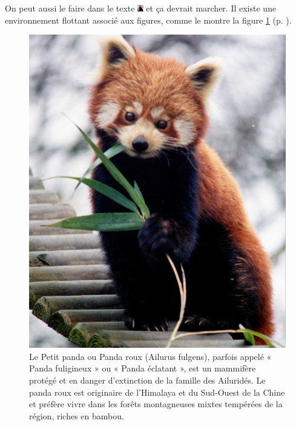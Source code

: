 \documentclass[10pt,a4paper]{article}
\begin{document}
On peut aussi le faire dans le texte \includegraphics[width=2.5mm]{figures/firefox.jpg} et ça devrait marcher. 
Il existe une environnement flottant associé aux figures, comme le montre la figure \ref{fig:panda_roux} (p. \pageref{fig:panda_roux}).

\begin{figure}[b!]
\begin{center}
\includegraphics[width=1.\textwidth]{figures/firefox.jpg} %
\end{center}
\caption{Le Petit panda ou Panda roux (Ailurus fulgens), parfois appelé « Panda fuligineux » ou « Panda éclatant », est un mammifère protégé et en danger d'extinction de la famille des Ailuridés. 
Le panda roux est originaire de l'Himalaya et du Sud-Ouest de la Chine et préfère vivre dans les forêts montagneuses mixtes tempérées de la région, riches en bambou. }
\label{fig:panda_roux}
\end{figure}

\blindtext[10]

\blindtext[10]
	
\end{document}

